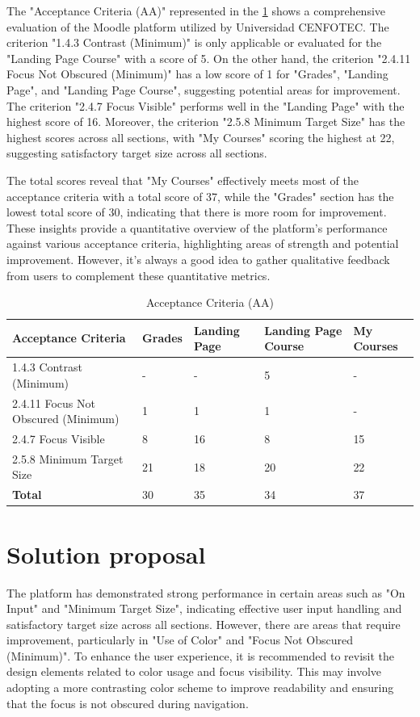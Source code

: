 \documentclass{IEEEtran}
\begin{document}
The "Acceptance Criteria (AA)" represented in the \ref{tab:table2} shows a comprehensive evaluation of the Moodle platform utilized by Universidad CENFOTEC. The criterion "1.4.3 Contrast (Minimum)" is only applicable or evaluated for the "Landing Page Course" with a score of 5. On the other hand, the criterion "2.4.11 Focus Not Obscured (Minimum)" has a low score of 1 for "Grades", "Landing Page", and "Landing Page Course", suggesting potential areas for improvement. The criterion "2.4.7 Focus Visible" performs well in the "Landing Page" with the highest score of 16. Moreover, the criterion "2.5.8 Minimum Target Size" has the highest scores across all sections, with "My Courses" scoring the highest at 22, suggesting satisfactory target size across all sections.

The total scores reveal that "My Courses" effectively meets most of the acceptance criteria with a total score of 37, while the "Grades" section has the lowest total score of 30, indicating that there is more room for improvement. These insights provide a quantitative overview of the platform's performance against various acceptance criteria, highlighting areas of strength and potential improvement. However, it's always a good idea to gather qualitative feedback from users to complement these quantitative metrics.

\begin{table}[h]
    \centering
    \caption{Acceptance Criteria (AA)}
    \label{tab:table2}
    \begin{tabularx}{\columnwidth}{|X|X|X|X|X|}
    \hline
    \textbf{Acceptance Criteria} & \textbf{Grades} & \textbf{Landing Page} & \textbf{Landing Page Course} & \textbf{My Courses}  \\ 
    \hline
    1.4.3 Contrast (Minimum) & - & - & 5 & - 
    \\ \hline
    2.4.11 Focus Not Obscured (Minimum) & 1 & 1 & 1 & - 
    \\ \hline
    2.4.7 Focus Visible & 8 & 16 & 8 & 15 
    \\ \hline
    2.5.8 Minimum Target Size & 21 & 18 & 20 & 22 
    \\ \hline
    \textbf{Total} & 30 & 35 & 34 & 37 
    \\ \hline
    \end{tabularx}
    \end{table}
    



\section{Solution proposal}
The platform has demonstrated strong performance in certain areas such as "On Input" and "Minimum Target Size", indicating effective user input handling and satisfactory target size across all sections. However, there are areas that require improvement, particularly in "Use of Color" and "Focus Not Obscured (Minimum)". To enhance the user experience, it is recommended to revisit the design elements related to color usage and focus visibility. This may involve adopting a more contrasting color scheme to improve readability and ensuring that the focus is not obscured during navigation. 
\end{document}
